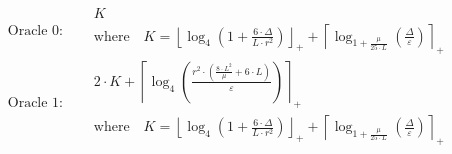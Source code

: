 \[\text{Oracle 0:}\quad \begin{aligned} &K \\ &\text{where}\quad K = \left\lfloor \log_{4}\left(1 + \frac{6 \cdot \Delta}{L \cdot r^{2}}\right) \right\rfloor_{+} + \left\lceil \log_{1 + \frac{\mu}{25 \cdot L}}\left(\frac{\Delta}{\varepsilon}\right) \right\rceil_{+}\end{aligned}\]
\[\text{Oracle 1:}\quad \begin{aligned} &2 \cdot K + \left\lceil \log_{4}\left(\frac{r^{2} \cdot \left(\frac{8 \cdot L^{2}}{\mu} + 6 \cdot L\right)}{\varepsilon}\right) \right\rceil_{+} \\ &\text{where}\quad K = \left\lfloor \log_{4}\left(1 + \frac{6 \cdot \Delta}{L \cdot r^{2}}\right) \right\rfloor_{+} + \left\lceil \log_{1 + \frac{\mu}{25 \cdot L}}\left(\frac{\Delta}{\varepsilon}\right) \right\rceil_{+}\end{aligned}\]

